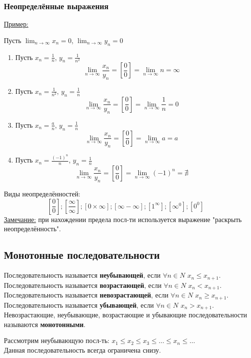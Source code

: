 \documentclass[12pt]{article}
\begin{document}
    \subsubsection*{Неопределённые выражения}
    \noindent \underline{Пример:}
    \begin{adjustwidth}{1.5em}{1.5em}
        Пусть $\lim_{n\to\infty}x_n = 0$, $\lim_{n\to\infty}y_n = 0$
        \begin{enumerate}
            \item Пусть $x_n = \frac{1}{n}$, $y_n = \frac{1}{n^2}$
            \[ \lim_{n\to\infty}\frac{x_n}{y_n} = \left[\frac{0}{0}\right] = \lim_{n\to\infty}n = \infty \]
            \item Пусть $x_n = \frac{1}{n^2}$, $y_n = \frac{1}{n}$
            \[ \lim_{n\to\infty}\frac{x_n}{y_n} = \left[\frac{0}{0}\right] = \lim_{n\to\infty}\frac{1}{n} = 0 \]
            \item Пусть $x_n = \frac{a}{n}$, $y_n = \frac{1}{n}$
            \[ \lim_{n\to\infty}\frac{x_n}{y_n} = \left[\frac{0}{0}\right] = \lim_{n\to\infty}a = a \]
            \item Пусть $x_n = \frac{(-1)^n}{n}$, $y_n = \frac{1}{n}$
            \[ \lim_{n\to\infty}\frac{x_n}{y_n} = \left[\frac{0}{0}\right] = \lim_{n\to\infty}(-1)^n = \nexists \]
        \end{enumerate}
    \end{adjustwidth}
    Виды неопределённостей:
    \[
        \left[\frac{0}{0}\right];
        \left[\frac{\infty}{\infty}\right];
        \left[0 \times \infty\right];
        \left[\infty - \infty\right];
        \left[1^\infty\right];
        \left[\infty^0\right]; 
        \left[0^0\right]
    \]
    \underline{Замечание:} при нахождении предела посл-ти используется выражение "раскрыть неопределённость".

    \subsection{Монотонные последовательности}
    \noindent Последовательность называется \textbf{неубывающей}, если $\forall n \in N$ $x_n \le x_{n+1}$.\\
    Последовательность называется \textbf{возрастающей}, если $\forall n \in N$ $x_n < x_{n+1}$.\\
    Последовательность называется \textbf{невозрастающей}, если $\forall n \in N$ $x_n \ge x_{n+1}$.\\
    Последовательность называется \textbf{убывающей}, если $\forall n \in N$ $x_n > x_{n+1}$.\\
    Невозрастающие, неубывающие, возрастающие и убывающие последовательности называются \textbf{монотонными}.\par\noindent
    Рассмотрим неубывающую посл-ть: $x_{1} \le x_{2} \le x_{3} \le \dots \le x_n \le \dots$\\
    Данная последовательность всегда ограничена снизу.\par
\end{document}
